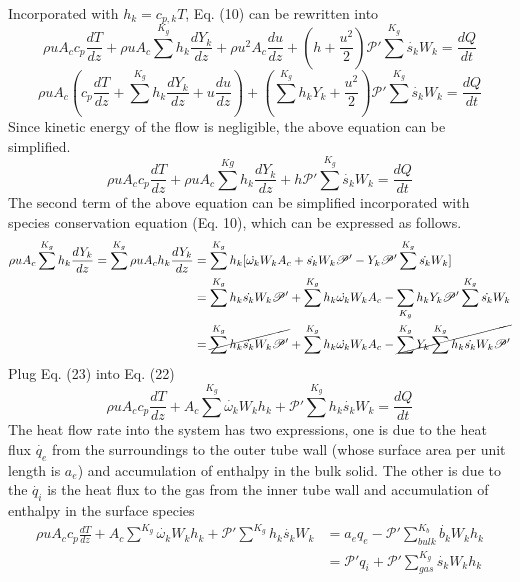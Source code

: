 \documentclass[11pt]{article}
\begin{document}
Incorporated with $h_k = c_{p,k} T $, Eq. (10) can be rewritten into
\begin{equation}
    \rho u A_c c_p \frac{dT}{dz} + \rho u A_c \sum^{K_g}h_k\frac{dY_k}{dz}+\rho u^2 A_c \frac{du}{dz} +(h+\frac{u^2}{2})\mathscr{P}'\sum^{K_g}\dot{s_k} W_k= \frac{dQ}{dt} 
\end{equation}
\begin{equation}
    \rho u A_c  (c_p\frac{dT}{dz} + \sum^{K_g}h_k\frac{dY_k}{dz}+u \frac{du}{dz}) +(\sum^{K_g}h_kY_k+\frac{u^2}{2})\mathscr{P}'\sum^{K_g}\dot{s_k} W_k= \frac{dQ}{dt} 
\end{equation}
Since kinetic energy of the flow is negligible, the above equation can be simplified.
\begin{equation}
    \rho u A_c c_p \frac{dT}{dz} + \rho u  A_c \sum^{Kg}h_k\frac{dY_k}{dz} + h\mathscr{P}'\sum^{K_g}\dot{s_k}{W_k} = \frac{dQ}{dt}
\end{equation}
The second term of the above equation can be simplified incorporated with species conservation equation (Eq. 10), which can be expressed as follows.
\begin{equation}
\begin{split}
    \rho u A_c \sum^{K_g} h_k \frac{dY_k}{dz} = \sum^{K_g}\rho u A_ch_k \frac{dY_k}{dz} &= \sum^{K_g}h_k[\dot{\omega_k}W_kA_c + \dot{s_k}W_k\mathscr{P}' - Y_k\mathscr{P}'\sum^{K_g}\dot{s_k}W_k]\\
    &= \sum^{K_g}h_k\dot{s_k}W_k\mathscr{P}'+ \sum^{K_g}h_k\dot{\omega_k}W_kA_c - \sum_{K_g}h_kY_k\mathscr{P}'\sum^{K_g}\dot{s_k}W_k\\
    &= \cancel{\sum^{K_g}h_k\dot{s_k}W_k\mathscr{P}'}+ \sum^{K_g}h_k\dot{\omega_k}W_kA_c -
    \cancel{\sum^{K_g}Y_k\sum^{K_g}h_k\dot{s_k}W_k\mathscr{P}'}
\end{split}
\end{equation}
Plug Eq. (23) into Eq. (22)
\begin{equation}
\rho u A_c c_p \frac{dT}{dz} + A_c\sum^{K_g}\dot{\omega_k}W_kh_k + \mathscr{P}'\sum^{K_g}h_k\dot{s_k}{W_k} = \frac{dQ}{dt}
\end{equation}
The heat flow rate into the system has two expressions, one is due to the heat flux $\dot{q_e}$ from the surroundings to the outer tube wall (whose surface area per unit length is $a_e$) and accumulation of enthalpy in the bulk solid. The other is due to the $\dot{q_i}$ is the heat flux to the gas from the inner tube wall and accumulation of enthalpy in the surface species \cite{coltrin1991surface,larson1996plug}
\begin{equation}
\boxed{\begin{aligned}
\rho u A_c c_p \frac{dT}{dz} + A_c\sum^{K_g}\dot{\omega_k}W_kh_k + \mathscr{P}'\sum^{K_g}h_k\dot{s_k}{W_k} &= a_e q_e - \mathscr{P}'\sum^{K_b}_{bulk} \dot{b_k}W_kh_k\\
&=\mathscr{P}'q_i + \mathscr{P}'\sum_{gas}^{K_g}\dot{s_k}W_kh_k
\end{aligned}}
\end{equation}
\end{document}
